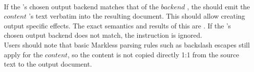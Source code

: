  \\

If the 's chosen output backend matches that of the \inline$backend$ , the  should emit the \inline$content$ 's text verbatim into the resulting document. This should allow creating output specific effects. The exact semantics and results of this are . If the 's chosen output backend does not match, the instruction is ignored. \\

Users should note that basic Markless parsing rules such as backslash escapes still apply for the \inline$content$, so the content is not copied directly 1:1 from the source text to the output document. \\

\begin{examples}
\end{examples}

